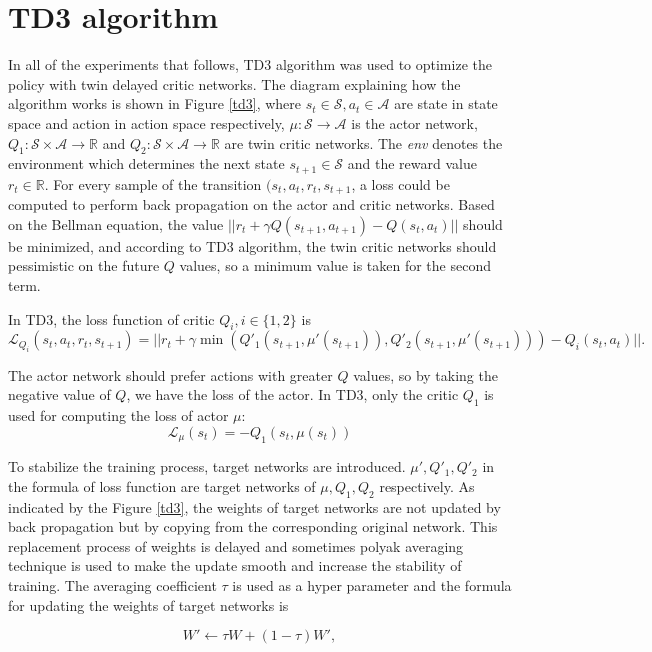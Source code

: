\documentclass[a4paper, 12pt]{report}
\begin{document}
    \section{TD3 algorithm}
    In all of the experiments that follows, TD3 algorithm\cite{DBLP:journals/corr/abs-1802-09477} was used to optimize the policy with twin delayed critic networks. The diagram explaining how the algorithm works is shown in Figure \ref{td3}, where $s_t\in\mathcal S, a_t\in\mathcal A$ are state in state space and action in action space respectively, $\mu:\mathcal S\to \mathcal A$ is the actor network, $Q_1:\mathcal S\times \mathcal A\to \mathbb R$ and $Q_2:\mathcal S\times \mathcal A\to \mathbb R$ are twin critic networks. The \emph{env} denotes the environment which determines the next state $s_{t+1}\in\mathcal S$ and the reward value $r_t\in \mathbb R$. For every sample of the transition $(s_t,a_t,r_t,s_{t+1}$, a loss could be computed to perform back propagation on the actor and critic networks. Based on the Bellman equation, the value $||r_t + \gamma Q(s_{t+1}, a_{t+1}) - Q(s_t, a_t)||$ should be minimized, and according to TD3 algorithm, the twin critic networks should pessimistic on the future $Q$ values, so a minimum value is taken for the second term. 

    In TD3, the loss function of critic $Q_i, i\in\{1,2\}$ is 
    $$\mathcal L_{Q_i} (s_t, a_t, r_t, s_{t+1}) = ||r_t + \gamma \min(Q'_1( s_{t+1}, \mu'(s_{t+1})), Q'_2( s_{t+1}, \mu'(s_{t+1}))) - Q_i(s_t, a_t)||.$$ 

    The actor network should prefer actions with greater $Q$ values, so by taking the negative value of $Q$, we have the loss of the actor. In TD3, only the critic $Q_1$ is used for computing the loss of actor $\mu$:
    $$\mathcal L_{\mu} (s_t) = -Q_1(s_t, \mu(s_t))$$

    To stabilize the training process, target networks are introduced. $\mu',Q'_1,Q'_2$ in the formula of loss function are target networks of $\mu, Q_1, Q_2$ respectively. As indicated by the Figure \ref{td3}, the weights of target networks are not updated by back propagation but by copying from the corresponding original network. This replacement process of weights is delayed and sometimes polyak averaging technique is used to make the update smooth and increase the stability of training. The averaging coefficient $\tau$ is used as a hyper parameter and the formula for updating the weights of target networks is

    $$W' \gets \tau W + (1-\tau) W',$$
\end{document}
